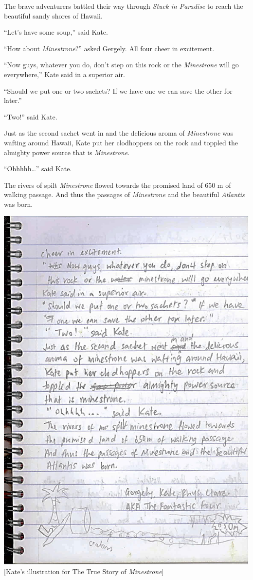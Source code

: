 The brave adventurers battled their way through \emph{Stuck in Paradise}
to reach the beautiful sandy shores of Hawaii.

``Let's have some soup,'' said Kate.

``How about \emph{Minestrone}?'' asked Gergely. All four cheer in
excitement.

``Now guys, whatever you do, don't step on this rock or the
\emph{Minestrone} will go everywhere,'' Kate said in a superior air.

``Should we put one or two sachets? If we have one we can save the other
for later.''

``Two!'' said Kate.

Just as the second sachet went in and the delicious aroma of
\emph{Minestrone} was wafting around Hawaii, Kate put her clodhoppers on
the rock and toppled the almighty power source that is
\emph{Minestrone}.

``Ohhhhh\ldots{}'' said Kate.

The rivers of spilt \emph{Minestrone} flowed towards the promised land
of 650 m of walking passage. And thus the passages of \emph{Minestrone}
and the beautiful \emph{Atlantis} was born.

\includegraphics{UgLog1012/81.jpeg}\\
{[}Kate's illustration for The True Story of \emph{Minestrone}{]}

